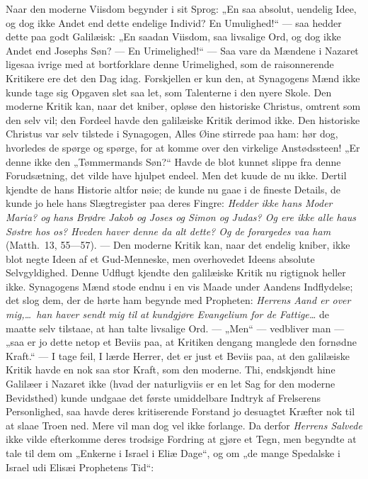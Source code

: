 \documentclass[12pt,a4paper]{book}
\begin{document}
Naar den moderne Viisdom begynder i sit Sprog: „En saa absolut, uendelig Idee, og dog
ikke Andet end dette endelige Individ? En Umulighed!“ --- saa hedder dette paa godt
Galilæisk: „En saadan Viisdom, saa livsalige Ord, og dog ikke Andet end Josephs Søn? ---
En Urimelighed!“ --- Saa vare da Mændene i Nazaret ligesaa ivrige med at bortforklare
denne Urimelighed, som de raisonnerende Kritikere ere det den Dag idag. Forskjellen er
kun den, at Synagogens Mænd ikke kunde tage sig Opgaven slet saa let, som Talenterne i
den nyere Skole. Den moderne Kritik kan, naar det kniber, opløse den historiske Christus,
omtrent som den selv vil; den Fordeel havde den galilæiske Kritik derimod ikke. Den
historiske Christus var selv tilstede i Synagogen, Alles Øine stirrede paa ham: hør dog,
hvorledes de spørge og spørge,
for at komme over den virkelige Anstødssteen! „Er denne ikke den „Tømmermands Søn?“ Havde
de blot kunnet slippe fra denne Forudsætning, det vilde have hjulpet endeel. Men det
kuude de nu ikke. Dertil kjendte de hans Historie altfor nøie; de kunde nu gaae i de
fineste Details, de kunde jo hele hans Slægtregister paa deres Fingre: \emph{Hedder ikke
hans Moder Maria? og hans Brødre Jakob og Joses og Simon og Judas? Og ere ikke alle haus
Søstre hos os? Hveden haver denne da alt dette? Og de forargedes vaa ham} (Matth.\ 13,
55---57). --- Den moderne Kritik kan, naar det endelig kniber, ikke blot negte Ideen af
et Gud-Menneske, men overhovedet Ideens absolute Selvgyldighed. Denne Udflugt kjendte den
galilæiske Kritik nu rigtignok heller ikke. Synagogens Mænd stode endnu i en vis Maade
under Aandens Indflydelse; det slog dem, der de hørte ham begynde med Propheten:
\emph{Herrens Aand er over mig,\ldots\ han haver sendt mig til at kundgjøre Evangelium
for de Fattige\ldots} de maatte selv tilstaae, at han talte livsalige Ord. --- „Men“ ---
vedbliver man --- „saa er jo dette netop et Beviis paa, at Kritiken dengang manglede den
fornødne Kraft.“ --- I tage feil, I lærde Herrer, det er just et Beviis paa, at den
galilæiske Kritik havde en nok saa stor Kraft, som den moderne. Thi, endskjøndt hine
Galilæer i Nazaret ikke (hvad der naturligviis er en let Sag for den moderne Bevidsthed)
kunde undgaae det første umiddelbare Indtryk af Frelserens Personlighed, saa havde deres
kritiserende Forstand jo desuagtet Kræfter nok til at slaae Troen ned. Mere vil man dog
vel ikke forlange. Da derfor \emph{Herrens Salvede} ikke vilde efterkomme deres trodsige
Fordring at gjøre et Tegn, men begyndte at tale til dem om „Enkerne i Israel i Eliæ
Dage“, og om „de mange Spedalske i Israel udi Elisæi Prophetens Tid“:
\end{document}
